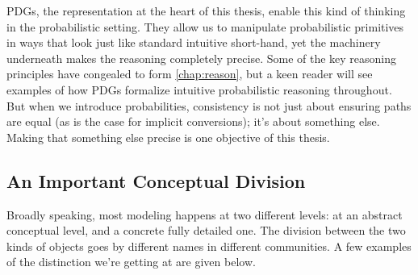 PDGs, the representation at the heart of this thesis, enable this kind of thinking in the probabilistic setting.
They allow us to manipulate probabilistic primitives in ways that look just like standard intuitive short-hand, yet the machinery underneath makes the reasoning completely precise.
Some of the key reasoning principles have congealed to form \cref{chap:reason},
but a keen reader will see examples of how PDGs formalize intuitive probabilistic reasoning throughout. 
But when we introduce probabilities, consistency is not just about ensuring paths are equal 
    (as is the case for implicit conversions); it's about something else. 
Making that something else precise is one objective of this thesis. 
%


\subsection{An Important Conceptual Division}

Broadly speaking, most modeling happens at two different levels: 
    at an abstract conceptual level, and a concrete fully detailed one.
The division between the two kinds of objects
    goes by different names in different communities. 
A few examples of the distinction we're getting at are given below.

